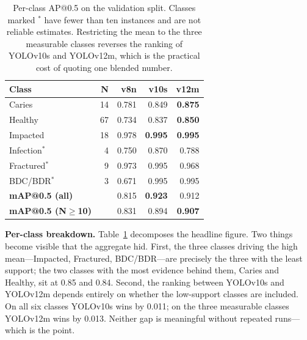 \documentclass[10pt,twocolumn]{article}
\newcommand{\clsname}[1]{\textsf{#1}}
\begin{document}
\begin{table}[t]
\centering\small
\begin{tabular}{lrrrr}
\toprule
\textbf{Class} & \textbf{N} & \textbf{v8n} & \textbf{v10s} & \textbf{v12m} \\
\midrule
\clsname{Caries}    & 14 & 0.781 & 0.849 & \textbf{0.875} \\
\clsname{Healthy}   & 67 & 0.734 & 0.837 & \textbf{0.850} \\
\clsname{Impacted}  & 18 & 0.978 & \textbf{0.995} & \textbf{0.995} \\
\midrule
\clsname{Infection}$^\ast$ & \phantom{0}4 & 0.750 & 0.870 & 0.788 \\
\clsname{Fractured}$^\ast$ & \phantom{0}9 & 0.973 & 0.995 & 0.968 \\
\clsname{BDC/BDR}$^\ast$   & \phantom{0}3 & 0.671 & 0.995 & 0.995 \\
\midrule
\textbf{mAP@0.5 (all)}         & & 0.815 & \textbf{0.923} & 0.912 \\
\textbf{mAP@0.5 (N$\geq$10)}   & & 0.831 & 0.894 & \textbf{0.907} \\
\bottomrule
\end{tabular}
\caption{Per-class AP@0.5 on the validation split. Classes marked $^\ast$ have
fewer than ten instances and are not reliable estimates. Restricting the mean to
the three measurable classes reverses the ranking of YOLOv10s and YOLOv12m,
which is the practical cost of quoting one blended number.}
\label{tab:perclass}
\end{table}

\textbf{Per-class breakdown.} Table~\ref{tab:perclass} decomposes the headline
figure. Two things become visible that the aggregate hid. First, the three
classes driving the high mean---\clsname{Impacted}, \clsname{Fractured},
\clsname{BDC/BDR}---are precisely the three with the least support; the two
classes with the most evidence behind them, \clsname{Caries} and
\clsname{Healthy}, sit at 0.85 and 0.84. Second, the ranking between YOLOv10s and
YOLOv12m depends entirely on whether the low-support classes are included. On
all six classes YOLOv10s wins by 0.011; on the three measurable classes YOLOv12m
wins by 0.013. Neither gap is meaningful without repeated runs---which is the
point.
\end{document}
